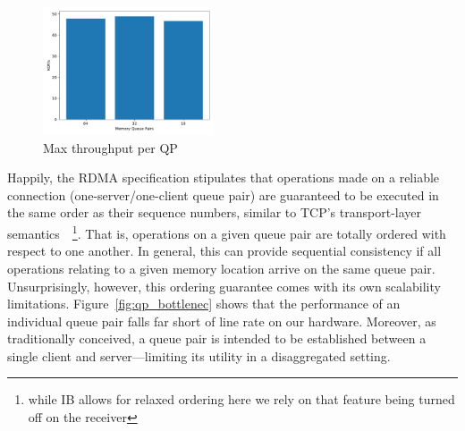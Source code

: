 \begin{figure}[t]
    \includegraphics[width=0.45\textwidth]{fig/qp_bottleneck.pdf}
    \caption{Max throughput per QP }
    \label{fig:qp_bottleneck}
\end{figure}

Happily, the RDMA specification stipulates that operations made on a
reliable connection (one-server/one-client queue pair) are guaranteed
to be executed in the same order as their sequence numbers, similar to
TCP's transport-layer semantics~\cite{infiniband-spec}~\footnote{while
IB allows for relaxed ordering here we rely on that feature being
turned off on the receiver}. That is, operations on a given queue pair
are totally ordered with respect to one another.
In general, this can provide sequential consistency if
all operations relating to a given memory location arrive on the same
queue pair.  Unsurprisingly, however, this ordering guarantee comes
with its own scalability limitations.  Figure~\ref{fig:qp_bottlenec}
shows that the performance of an individual queue pair falls far short
of line rate on our hardware.  Moreover, as traditionally conceived, a
queue pair is intended to be established between a single client and
server---limiting its utility in a disaggregated setting.






